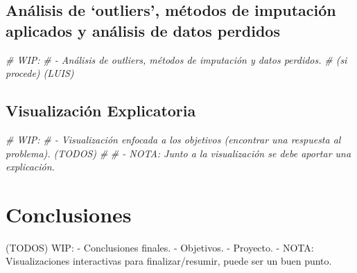 \documentclass[,,,,pdftex]{Definitions/mdpi}
\newenvironment{Shaded}{\begin{snugshade}}{\end{snugshade}}
\newcommand{\CommentTok}[1]{\textcolor[rgb]{0.56,0.35,0.01}{\textit{#1}}}
\begin{document}
\subsection{Análisis de `outliers', métodos de imputación aplicados y
análisis de datos
perdidos}\label{anuxe1lisis-de-outliers-muxe9todos-de-imputaciuxf3n-aplicados-y-anuxe1lisis-de-datos-perdidos}

\begin{Shaded}
\begin{Highlighting}[]
\CommentTok{\# WIP:}
\CommentTok{\#   {-} Análisis de outliers, métodos de imputación y datos perdidos.}
\CommentTok{\# (si procede) (LUIS)}
\end{Highlighting}
\end{Shaded}

\subsection{Visualización
Explicatoria}\label{visualizaciuxf3n-explicatoria}

\begin{Shaded}
\begin{Highlighting}[]
\CommentTok{\# WIP:}
\CommentTok{\#   {-} Visualización enfocada a los objetivos (encontrar una respuesta al problema). (TODOS)}
\CommentTok{\#}
\CommentTok{\# {-} NOTA: Junto a la visualización se debe aportar una explicación.}
\end{Highlighting}
\end{Shaded}

\section{Conclusiones}\label{conclusiones}

(TODOS) WIP: - Conclusiones finales. - Objetivos. - Proyecto. - NOTA:
Visualizaciones interactivas para finalizar/resumir, puede ser un buen
punto.


\vspace{6pt}


\end{document}
